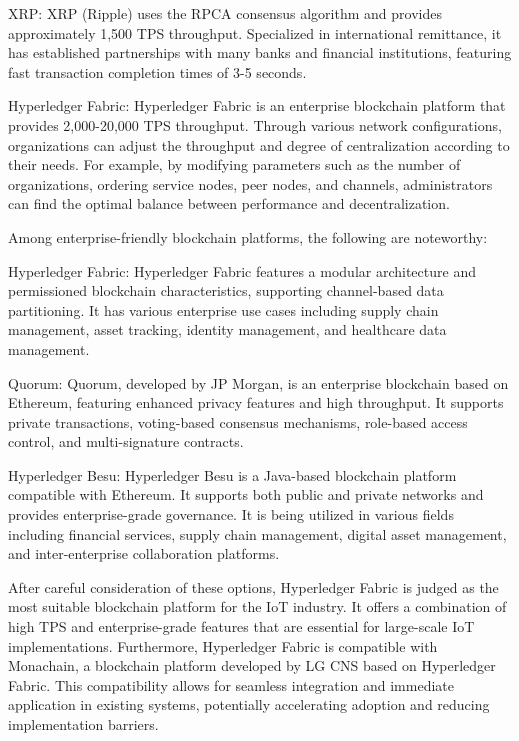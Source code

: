 \documentclass[conference]{IEEEtran}
\begin{document}
\begin{enumerate}[itemsep=2ex, parsep=1ex]
	      XRP: XRP (Ripple) uses the RPCA consensus algorithm and provides
	      approximately 1,500 TPS throughput. Specialized in international remittance,
	      it has established partnerships with many banks and financial institutions,
	      featuring fast transaction completion times of 3-5 seconds.
	      	      
	      Hyperledger Fabric: Hyperledger Fabric is an enterprise blockchain
	      platform that provides 2,000-20,000 TPS throughput. Through various network
	      configurations, organizations can adjust the throughput and degree of
	      centralization according to their needs. For example, by modifying
	      parameters such as the number of organizations, ordering service nodes,
	      peer nodes, and channels, administrators can find the optimal balance
	      between performance and decentralization.
	      	      
	      Among enterprise-friendly blockchain platforms, the following are noteworthy:
	      	      
	      Hyperledger Fabric: Hyperledger Fabric features a modular architecture and
	      permissioned blockchain characteristics, supporting channel-based data partitioning.
	      It has various enterprise use cases including supply chain management, asset
	      tracking, identity management, and healthcare data management.
	      	      
	      Quorum: Quorum, developed by JP Morgan, is an enterprise blockchain based
	      on Ethereum, featuring enhanced privacy features and high throughput. It
	      supports private transactions, voting-based consensus mechanisms, role-based
	      access control, and multi-signature contracts.
	      	      
	      Hyperledger Besu: Hyperledger Besu is a Java-based blockchain platform
	      compatible with Ethereum. It supports both public and private networks and
	      provides enterprise-grade governance. It is being utilized in various
	      fields including financial services, supply chain management, digital
	      asset management, and inter-enterprise collaboration platforms.
	      	      
	      After careful consideration of these options, Hyperledger Fabric is judged
	      as the most suitable blockchain platform for the IoT industry. It offers a
	      combination of high TPS and enterprise-grade features that are essential for
	      large-scale IoT implementations. Furthermore, Hyperledger Fabric is compatible
	      with Monachain, a blockchain platform developed by LG CNS based on
	      Hyperledger Fabric. This compatibility allows for seamless integration and
	      immediate application in existing systems, potentially accelerating
	      adoption and reducing implementation barriers.
	      	      

\end{enumerate}
\end{document}
